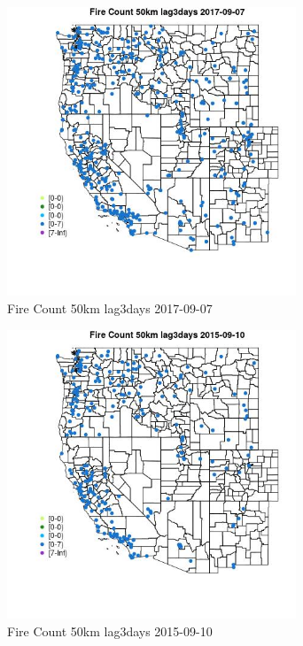 \begin{figure} 
\centering  
\includegraphics[width=0.77\textwidth]{Code_Outputs/Report_ML_input_PM25_Step4_part_e_de_duplicated_aves_compiled_2019-05-20wNAs_MapObsFire_Count_50km_lag3days2017-09-07.jpg} 
\caption{\label{fig:Report_ML_input_PM25_Step4_part_e_de_duplicated_aves_compiled_2019-05-20wNAsMapObsFire_Count_50km_lag3days2017-09-07}Fire Count 50km lag3days 2017-09-07} 
\end{figure} 
 

\begin{figure} 
\centering  
\includegraphics[width=0.77\textwidth]{Code_Outputs/Report_ML_input_PM25_Step4_part_e_de_duplicated_aves_compiled_2019-05-20wNAs_MapObsFire_Count_50km_lag3days2015-09-10.jpg} 
\caption{\label{fig:Report_ML_input_PM25_Step4_part_e_de_duplicated_aves_compiled_2019-05-20wNAsMapObsFire_Count_50km_lag3days2015-09-10}Fire Count 50km lag3days 2015-09-10} 
\end{figure} 
 

